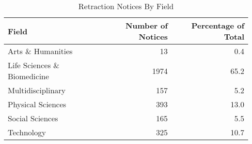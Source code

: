 \begin{table}[!htb]
\centering
  \caption{Retraction Notices By Field}
\begin{tabular}{lrr}
  \hline
Field & Number of Notices & Percentage of Total \\ 
  \hline
Arts \& Humanities & 13 & 0.4 \\ 
  Life Sciences \& Biomedicine & 1974 & 65.2 \\ 
  Multidisciplinary & 157 & 5.2 \\ 
  Physical Sciences & 393 & 13.0 \\ 
  Social Sciences & 165 & 5.5 \\ 
  Technology & 325 & 10.7 \\ 
   \hline
\end{tabular}
\label{tab:ret_field}
\end{table}

